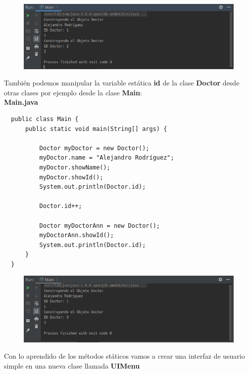 \documentclass{article}
\begin{document}
\begin{figure}[h!]
  \centering
  \includegraphics[scale=0.75]{./Pictures/016_static_id.png}
\end{figure}

También podemos manipular la variable estática \textbf{id} de la clase
\textbf{Doctor} desde otras clases por ejemplo desde la clase \textbf{Main}:\\

\textbf{Main.java}
\begin{verbatim}
  public class Main {
      public static void main(String[] args) {

          Doctor myDoctor = new Doctor();
          myDoctor.name = "Alejandro Rodríguez";
          myDoctor.showName();
          myDoctor.showId();
          System.out.println(Doctor.id);

          Doctor.id++;

          Doctor myDoctorAnn = new Doctor();
          myDoctorAnn.showId();
          System.out.println(Doctor.id);
      }
  }
\end{verbatim}

\begin{figure}[h!]
  \centering
  \includegraphics[scale=0.75]{./Pictures/017_static_id.png}
\end{figure}

Con lo aprendido de los métodos státicos vamos a crear una interfaz de usuario
simple en una nueva clase llamada \textbf{UIMenu}\\
\end{document}
